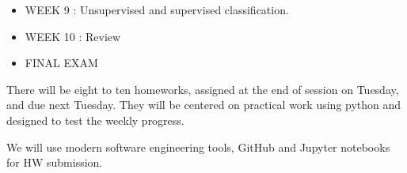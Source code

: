 \documentclass[10pt]{article}
\begin{document}
\begin{itemize}






\item WEEK  9 :  Unsupervised and supervised classification.



\item WEEK  10 :  Review

\item FINAL EXAM 

\end{itemize}


\vskip 0.2in


There will be eight to ten homeworks, assigned at the end of session on Tuesday, and due next Tuesday. They will
be centered on practical work using python and designed to test the weekly progress. 

We will use modern software engineering tools, GitHub and Jupyter notebooks for HW submission. 
\end{document}
